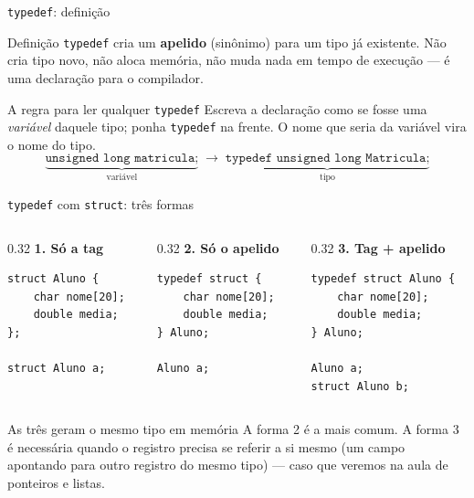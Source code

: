 \documentclass[aspectratio=169]{beamer}
\begin{document}
\begin{frame}{\texttt{typedef}: definição}
  \begin{block}{Definição}
    \texttt{typedef} cria um \textbf{apelido} (sinônimo) para um tipo já
    existente. Não cria tipo novo, não aloca memória, não muda nada em tempo de
    execução --- é uma declaração para o compilador.
  \end{block}
  \begin{exampleblock}{A regra para ler qualquer \texttt{typedef}}
    Escreva a declaração como se fosse uma \emph{variável} daquele tipo; ponha
    \texttt{typedef} na frente. O nome que seria da variável vira o nome do
    tipo.
    \[
      \underbrace{\texttt{unsigned long matricula;}}_{\text{variável}}
      \;\longrightarrow\;
      \underbrace{\texttt{typedef unsigned long Matricula;}}_{\text{tipo}}
    \]
  \end{exampleblock}
\end{frame}

\begin{frame}[fragile]{\texttt{typedef} com \texttt{struct}: três formas}
\begin{columns}[T]
\begin{column}{0.32\textwidth}
\textbf{1. Só a tag}
\begin{lstlisting}[basicstyle=\ttfamily\tiny]
struct Aluno {
    char nome[20];
    double media;
};

struct Aluno a;
\end{lstlisting}
\end{column}
\begin{column}{0.32\textwidth}
\textbf{2. Só o apelido}
\begin{lstlisting}[basicstyle=\ttfamily\tiny]
typedef struct {
    char nome[20];
    double media;
} Aluno;

Aluno a;
\end{lstlisting}
\end{column}
\begin{column}{0.32\textwidth}
\textbf{3. Tag + apelido}
\begin{lstlisting}[basicstyle=\ttfamily\tiny]
typedef struct Aluno {
    char nome[20];
    double media;
} Aluno;

Aluno a;
struct Aluno b;
\end{lstlisting}
\end{column}
\end{columns}
  \begin{block}{As três geram o mesmo tipo em memória}
    A forma 2 é a mais comum. A forma 3 é necessária quando o registro precisa
    se referir a si mesmo (um campo apontando para outro registro do mesmo
    tipo) --- caso que veremos na aula de ponteiros e listas.
  \end{block}
\end{frame}
\end{document}
